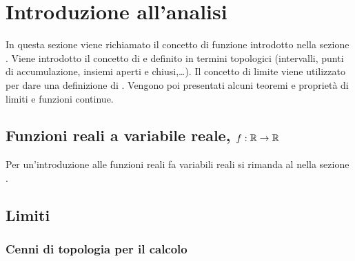 \documentclass[letterpaper,10pt,italian]{jupyterBook}
\begin{document}
\sphinxstepscope


\chapter{Introduzione all’analisi}
\label{\detokenize{ch/infinitesimal_calculus/analysis:introduzione-all-analisi}}\label{\detokenize{ch/infinitesimal_calculus/analysis:infinitesimal-calculus-analysis}}\label{\detokenize{ch/infinitesimal_calculus/analysis::doc}}
\sphinxAtStartPar
In questa sezione viene richiamato il concetto di funzione introdotto nella sezione {\hyperref[\detokenize{ch/precalculus:math-hs-precalculus}]{}}. Viene introdotto il concetto di {\hyperref[\detokenize{ch/infinitesimal_calculus/analysis:infinitesimal-calculus-limits}]{}} e definito in termini topologici (intervalli, punti di accumulazione, insiemi aperti e chiusi,…). Il concetto di limite viene utilizzato per dare una definizione di . Vengono poi presentati alcuni teoremi e proprietà di limiti e funzioni continue.




\section{Funzioni reali a variabile reale, \protect\(f: \mathbb{R} \rightarrow \mathbb{R}\protect\)}
\label{\detokenize{ch/infinitesimal_calculus/analysis:funzioni-reali-a-variabile-reale-f-mathbb-r-rightarrow-mathbb-r}}\label{\detokenize{ch/infinitesimal_calculus/analysis:infinitesimal-calculus-analysis-real-functions}}
\sphinxAtStartPar
Per un’introduzione alle funzioni reali fa variabili reali si rimanda al {\hyperref[\detokenize{ch/precalculus/real-functions:math-hs-precalculus-real-functions}]{}} nella sezione {\hyperref[\detokenize{ch/precalculus:math-hs-precalculus}]{}}.




\section{Limiti}
\label{\detokenize{ch/infinitesimal_calculus/analysis:limiti}}\label{\detokenize{ch/infinitesimal_calculus/analysis:infinitesimal-calculus-limits}}

\subsection{Cenni di topologia per il calcolo}
\label{\detokenize{ch/infinitesimal_calculus/analysis:cenni-di-topologia-per-il-calcolo}}
\sphinxAtStartPar
{} 
\end{document}
